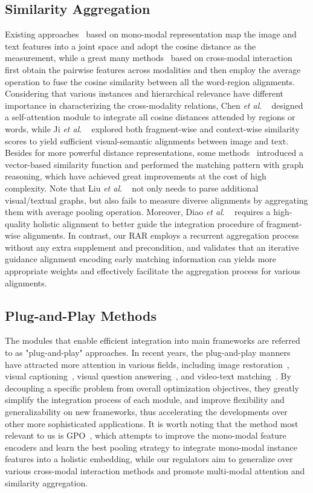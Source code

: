 \documentclass[journal]{IEEEtran}\newcommand{\ignore}[1]{}
\newcommand{\etal}{\textit{et al}. }
\begin{document}
\subsection{Similarity Aggregation}
Existing approaches~\cite{VSRN,SGM,WCGL,AME,GPO,CODER} based on mono-modal representation map the image and text features into a joint space and adopt the cosine distance as the measurement, while a great many methods~\cite{SCAN, PFAN, BFAN, RDAN, IMRAM} based on cross-modal interaction first obtain the pairwise features across modalities and then employ the average operation to fuse the cosine similarity between all the word-region alignments. 
Considering that various instances and hierarchical relevance have different importance in characterizing the cross-modality relations, Chen \etal~\cite{DP-RNN} designed a self-attention module to integrate all cosine distances attended by regions or words, while Ji \etal~\cite{SHAN} explored both fragment-wise and context-wise similarity scores to yield sufficient visual-semantic alignments between image and text.
Besides for more powerful distance representations, some methods~\cite{GSMN,SGRAF,CMCAN} introduced a vector-based similarity function and performed the matching pattern with graph reasoning, which have achieved great improvements at the cost of high complexity. 
Note that Liu \etal~\cite{GSMN} not only needs to parse additional visual/textual graphs, but also fails to measure diverse alignments by aggregating them with average pooling operation. 
Moreover, Diao \etal~\cite{SGRAF} requires a high-quality holistic alignment to better guide the integration procedure of fragment-wise alignments. 
In contrast, our RAR employs a recurrent aggregation process without any extra supplement and precondition, and validates that an iterative guidance alignment encoding early matching information can yields more appropriate weights and effectively facilitate the aggregation process for various alignments.

\subsection{Plug-and-Play Methods}
The modules that enable efficient integration into main frameworks are referred to as "plug-and-play" approaches. In recent years, the plug-and-play manners have attracted more attention in various fields, including image restoration~\cite{IDBP,H-PnP,H-PnP_extension,DPIR}, visual captioning~\cite{PickNet,RecNet}, visual question answering~\cite{RAGAN,CSS}, and video-text matching~\cite{MAC,RegionLearner}. By decoupling a specific problem from overall optimization objectives, they greatly simplify the integration process of each module, and improve flexibility and generalizability on new frameworks, thus accelerating the developments over other more sophisticated applications. It is worth noting that the method most relevant to us is GPO~\cite{GPO}, which attempts to improve the mono-modal feature encoders and learn the best pooling strategy to integrate mono-modal instance features into a holistic embedding, while our regulators aim to generalize over various cross-modal interaction methods and promote multi-modal attention and similarity aggregation.
\end{document}
